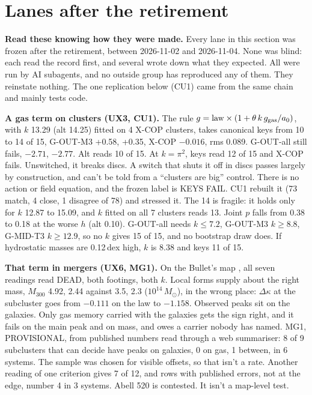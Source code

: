 \documentclass[10pt]{article}
\begin{document}
\section{Lanes after the retirement}\label{sec:after}
\textbf{Read these knowing how they were made.} Every lane in this section was frozen after the retirement, between 2026-11-02 and 2026-11-04. None was blind: each read the record first, and several wrote down what they expected. All were run by AI subagents, and no outside group has reproduced any of them. They reinstate nothing. The one replication below (CU1) came from the same chain and mainly tests code.

\textbf{A gas term on clusters (UX3, CU1).} The rule $g=\text{law}\times(1+\theta\,k\,g_{\rm gas}/a_0)$, with $k$ 13.29 (alt 14.25) fitted on 4 X-COP clusters, takes canonical keys from 10 to 14 of 15, G-OUT-M3 +0.58, +0.35, X-COP $-0.016$, rms 0.089. G-OUT-all still fails, $-2.71$, $-2.77$. Alt reads 10 of 15. At $k=\pi^2$, keys read 12 of 15 and X-COP fails. Unswitched, it breaks discs. A switch that shuts it off in discs passes largely by construction, and can't be told from a ``clusters are big'' control. There is no action or field equation, and the frozen label is KEYS FAIL. CU1 rebuilt it (73 match, 4 close, 1 disagree of 78) and stressed it. The 14 is fragile: it holds only for $k$ 12.87 to 15.09, and $k$ fitted on all 7 clusters reads 13. Joint $p$ falls from 0.38 to 0.18 at the worse $h$ (alt 0.10). G-OUT-all needs $k\le7.2$, G-OUT-M3 $k\ge8.8$, G-MID-T3 $k\ge12.9$, so no $k$ gives 15 of 15, and no bootstrap draw does. If hydrostatic masses are 0.12\,dex high, $k$ is 8.38 and keys 11 of 15.

\textbf{That term in mergers (UX6, MG1).} On the Bullet's map \cite{C06}, all seven readings read DEAD, both footings, both $k$. Local forms supply about the right mass, $M_{300}$ 4.92, 2.44 against 3.5, 2.3 ($10^{14}\,M_\odot$), in the wrong place: $\Delta\kappa$ at the subcluster goes from $-0.111$ on the law to $-1.158$. Observed peaks sit on the galaxies. Only gas memory carried with the galaxies gets the sign right, and it fails on the main peak and on mass, and owes a carrier nobody has named. MG1, PROVISIONAL, from published numbers read through a web summariser: 8 of 9 subclusters that can decide have peaks on galaxies, 0 on gas, 1 between, in 6 systems. The sample was chosen for visible offsets, so that isn't a rate. Another reading of one criterion gives 7 of 12, and rows with published errors, not at the edge, number 4 in 3 systems. Abell 520 is contested. It isn't a map-level test.
\end{document}
